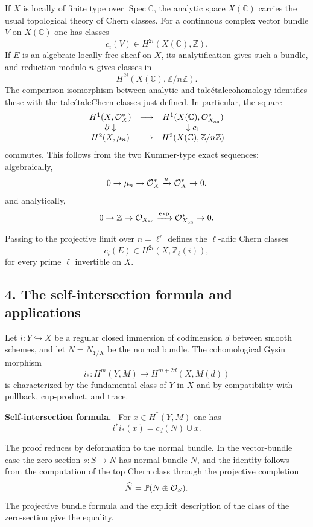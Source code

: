 \documentclass[11pt]{article}
\theoremstyle{plain}
\theoremstyle{definition}
\theoremstyle{remark}
\newenvironment{statement}[1]{\par\medskip\noindent\textbf{#1.}\ }{\par\medskip}
\newcommand{\CC}{\mathbb C}
\newcommand{\ZZ}{\mathbb Z}
\DeclareMathOperator{\Spec}{Spec}
\providecommand{\etale}{\ifmmode\acute{e}tale\else \'etale\fi}
\begin{document}
If $X$ is locally of finite type over $\Spec\CC$, the analytic space $X(\CC)$ carries the usual topological theory of Chern classes. For a continuous complex vector bundle $V$ on $X(\CC)$ one has classes
\[
   c_i(V)\in H^{2i}(X(\CC),\ZZ).
\]
If $E$ is an algebraic locally free sheaf on $X$, its analytification gives such a bundle, and reduction modulo $n$ gives classes in
\[
   H^{2i}(X(\CC),\ZZ/n\ZZ).
\]
The comparison isomorphism between analytic and \etale cohomology identifies these with the \etale Chern classes just defined. In particular, the square
\[
\begin{array}{ccc}
H^1(X,\cO_X^*) & \longrightarrow & H^1(X(\CC),\cO_{X_{\mathrm{an}}}^*) \\
\partial\downarrow && \downarrow c_1 \\
H^2(X,\mu_n) & \longrightarrow & H^2(X(\CC),\ZZ/n\ZZ)
\end{array}
\]
commutes. This follows from the two Kummer-type exact sequences: algebraically,
\[
   0\to\mu_n\to\mathcal O_X^*\xrightarrow{n}\mathcal O_X^*\to0,
\]
and analytically,
\[
   0\to\ZZ\to\cO_{X_{\mathrm{an}}}\xrightarrow{\exp}\cO_{X_{\mathrm{an}}}^*\to0.
\]

Passing to the projective limit over $n=\ell^r$ defines the $\ell$-adic Chern classes
\[
   c_i(E)\in H^{2i}(X,\ZZ_\ell(i)),
\]
for every prime $\ell$ invertible on $X$.

\subsection*{4. The self-intersection formula and applications}

Let $i:Y\hookrightarrow X$ be a regular closed immersion of codimension $d$ between smooth schemes, and let $N=N_{Y/X}$ be the normal bundle. The cohomological Gysin morphism
\[
   i_*:H^m(Y,M)\to H^{m+2d}(X,M(d))
\]
is characterized by the fundamental class of $Y$ in $X$ and by compatibility with pullback, cup-product, and trace.

\begin{statement}{Self-intersection formula}
For $x\in H^*(Y,M)$ one has
\[
   i^*i_*(x)=c_d(N)\cup x.
\]
\end{statement}

The proof reduces by deformation to the normal bundle. In the vector-bundle case the zero-section $s:S\to N$ has normal bundle $N$, and the identity follows from the computation of the top Chern class through the projective completion
\[
   \widehat N=\mathbb P(N\oplus\mathcal O_S).
\]
The projective bundle formula and the explicit description of the class of the zero-section give the equality.
\end{document}
